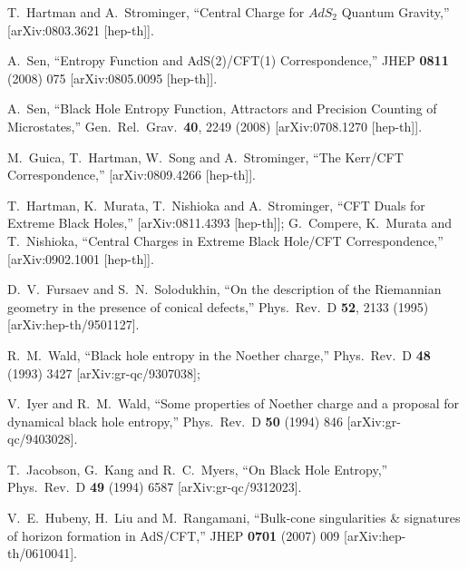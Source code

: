 \documentclass[12pt]{article}
\begin{document}
\begin{thebibliography}{99}
  T.~Hartman and A.~Strominger,
  ``Central Charge for $AdS_2$ Quantum Gravity,''
  [arXiv:0803.3621 [hep-th]].




  A.~Sen,
  ``Entropy Function and AdS(2)/CFT(1) Correspondence,''
  JHEP {\bf 0811} (2008) 075
  [arXiv:0805.0095 [hep-th]].



  A.~Sen,
  ``Black Hole Entropy Function, Attractors and Precision Counting of
  Microstates,''
  Gen.\ Rel.\ Grav.\  {\bf 40}, 2249 (2008)
  [arXiv:0708.1270 [hep-th]].


  M.~Guica, T.~Hartman, W.~Song and A.~Strominger,
  ``The Kerr/CFT Correspondence,''
  [arXiv:0809.4266 [hep-th]].

  T.~Hartman, K.~Murata, T.~Nishioka and A.~Strominger,
  ``CFT Duals for Extreme Black Holes,''
  [arXiv:0811.4393 [hep-th]];
  G.~Compere, K.~Murata and T.~Nishioka,
  ``Central Charges in Extreme Black Hole/CFT Correspondence,''
  [arXiv:0902.1001 [hep-th]].



  D.~V.~Fursaev and S.~N.~Solodukhin,
  ``On the description of the Riemannian geometry in the presence of conical
  defects,''
  Phys.\ Rev.\ D {\bf 52}, 2133 (1995)
  [arXiv:hep-th/9501127].


  R.~M.~Wald,
  ``Black hole entropy in the Noether charge,''
  Phys.\ Rev.\  D {\bf 48} (1993) 3427
  [arXiv:gr-qc/9307038];

  V.~Iyer and R.~M.~Wald,
  ``Some properties of Noether charge and a proposal for dynamical black hole
  entropy,''
  Phys.\ Rev.\  D {\bf 50} (1994) 846
  [arXiv:gr-qc/9403028].

  T.~Jacobson, G.~Kang and R.~C.~Myers,
  ``On Black Hole Entropy,''
  Phys.\ Rev.\  D {\bf 49} (1994) 6587
  [arXiv:gr-qc/9312023].


  V.~E.~Hubeny, H.~Liu and M.~Rangamani,
  ``Bulk-cone singularities \& signatures of horizon formation in AdS/CFT,''
  JHEP {\bf 0701} (2007) 009
  [arXiv:hep-th/0610041].












\end{thebibliography}
\end{document}
